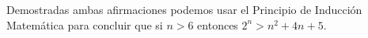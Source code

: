 \documentclass[10pt,letterpaper,fleqn]{article}
\begin{document}
\begin{enumerate}
\begin{enumerate}
            Demostradas ambas afirmaciones podemos usar el Principio de Inducción Matemática para concluir que si $n > 6$ entonces $2^n > n^2 + 4n+ 5$.

        \end{enumerate}

    \end{enumerate}            
\end{document}

